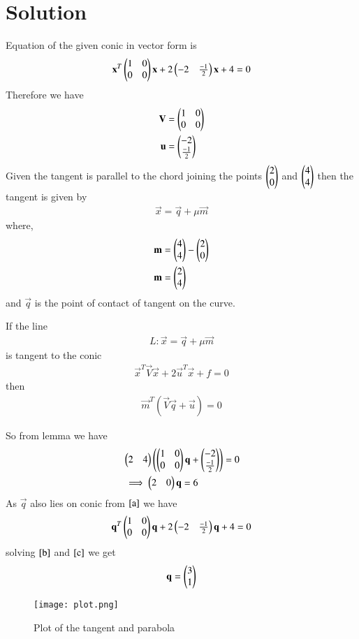 \documentclass[journal,12pt,twocolumn]{IEEEtran}
\begin{document}
\section{Solution}
Equation of the given conic in vector form is 
\begin{align}
    \mathbf{x}^T\begin{pmatrix}1 &0\\0 &0\end{pmatrix}\mathbf{x}+2\begin{pmatrix}-2 &\frac{-1}{2}\end{pmatrix}\mathbf{x}+4=0 \label{a}
\end{align}
Therefore we have
\begin{align}
    \mathbf{V} &= \begin{pmatrix}1 &0\\0 &0\end{pmatrix}\\
    \mathbf{u} &= \begin{pmatrix}-2 \\ \frac{-1}{2}\end{pmatrix}
\end{align}
Given the tangent is parallel to the chord joining the points $\begin{pmatrix}2\\0\end{pmatrix}$ and $\begin{pmatrix}4\\4\end{pmatrix}$ then the tangent is given by
\begin{align}
    \vec{x} = \vec{q}+\mu\vec{m}
\end{align}
where,
\begin{align}
    \mathbf{m} &= \begin{pmatrix}4\\4\end{pmatrix} - \begin{pmatrix}2\\0\end{pmatrix}\\
    \mathbf{m} &= \begin{pmatrix}2\\4\end{pmatrix}
\end{align}
and $\vec{q}$ is the point of contact of tangent on the curve.
\begin{lemma}
If the line
\begin{align}
    L: \vec{x} = \vec{q}+\mu\vec{m}
\end{align} 
is tangent to the conic 
\begin{align}
    \vec{x}^T\vec{V}\vec{x}+2\vec{u}^T\vec{x}+f=0
\end{align}
then 
\begin{align}
    \vec{m}^T(\vec{V}\vec{q}+\vec{u})=0
\end{align}
\end{lemma}
So from lemma we have 
\begin{align}
    &\begin{pmatrix}2 &4\end{pmatrix}\left(\begin{pmatrix}1 &0\\0 &0\end{pmatrix}\mathbf{q}+\begin{pmatrix}-2 \\ \frac{-1}{2}\end{pmatrix}\right)=0\\
    &\implies \begin{pmatrix}2 &0\end{pmatrix}\mathbf{q}=6   \label{b}
\end{align}
As $\vec{q}$ also lies on conic from $\eqref{a}$ we have
\begin{align}
    \mathbf{q}^T\begin{pmatrix}1 &0\\0 &0\end{pmatrix}\mathbf{q}+2\begin{pmatrix}-2 &\frac{-1}{2}\end{pmatrix}\mathbf{q}+4=0 \label{c}
\end{align}
solving $\eqref{b}$ and $\eqref{c}$ we get
\begin{align}
    \mathbf{q} = \begin{pmatrix}3\\1\end{pmatrix}
\end{align}
\begin{figure}[!ht]
    \centering
    \texttt{[image: plot.png]}
    \caption{Plot of the tangent and parabola}
    \label{plot}
\end{figure}
\end{document}
